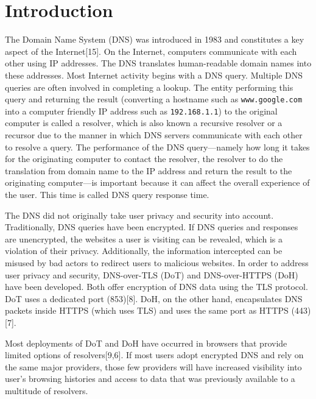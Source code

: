 \section{Introduction}\label{sec:intro}

The Domain Name System (DNS) was introduced in 1983 and constitutes a key aspect of the Internet[15].
On the Internet, computers communicate with each other using IP addresses.
The DNS translates human-readable domain names into these addresses.
Most Internet activity begins with a DNS query.
Multiple DNS queries are often involved in completing a lookup.
The entity performing this query and returning the result (converting a hostname such as \texttt{www.google.com} into a computer friendly IP address such as \texttt{192.168.1.1}) to the original computer is called a resolver, which is also known a recursive resolver or a recursor due to the  manner in which DNS servers communicate with each other to resolve a query.
The performance of the DNS query—namely how long it takes for the originating computer to contact the resolver, the resolver to do the translation from domain name to the IP address and return the result to the originating computer—is important because it can affect the overall experience of the user.
This time is called DNS query response time.

The DNS did not originally take user privacy and security into account.
Traditionally, DNS queries have been encrypted.
If DNS queries and responses are unencrypted, the websites a user is visiting can be revealed, which is a violation of their privacy.
Additionally, the information intercepted can be misused by bad actors to redirect users to malicious websites.
In order to address user privacy and security, DNS-over-TLS (DoT) and DNS-over-HTTPS (DoH) have been developed.
Both offer encryption of DNS data using the TLS protocol.
DoT uses a dedicated port (853)[8].
DoH, on the other hand, encapsulates DNS packets inside HTTPS (which uses TLS) and uses the same port as HTTPS (443)[7].

Most deployments of DoT and DoH have occurred in browsers that provide limited options of resolvers[9,6].
If most users adopt encrypted DNS and rely on the same major providers, those few providers will have increased visibility into user's browsing histories and access to data that was previously available to a multitude of resolvers.

